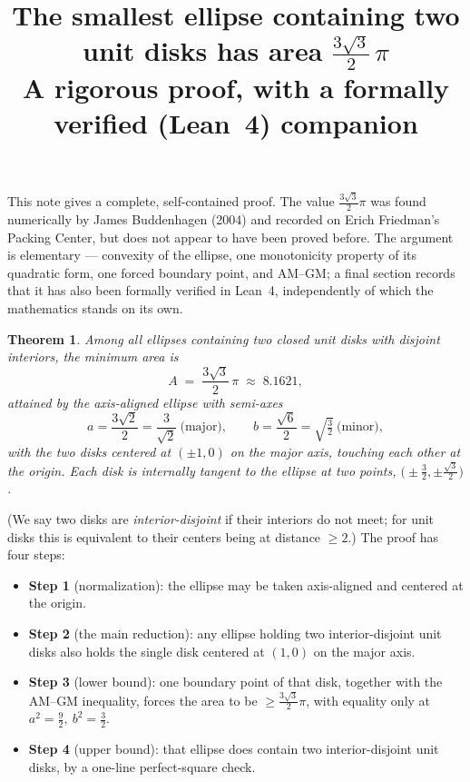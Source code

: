 \documentclass[11pt]{article}
\title{The smallest ellipse containing two unit disks has area $\tfrac{3\sqrt3}{2}\,\pi$\\[3pt]\large A rigorous proof, with a formally verified (Lean~4) companion}
\author{}
\date{}
\newtheorem{theorem}{Theorem}
\begin{document}
\maketitle

\noindent This note gives a complete, self-contained proof. The value $\tfrac{3\sqrt3}{2}\pi$ was found numerically by James Buddenhagen (2004) and recorded on Erich Friedman's Packing Center, but does not appear to have been proved before. The argument is elementary --- convexity of the ellipse, one monotonicity property of its quadratic form, one forced boundary point, and AM--GM; a final section records that it has also been formally verified in Lean~4, independently of which the mathematics stands on its own.

\begin{theorem}
Among all ellipses containing two closed unit disks with disjoint interiors, the minimum
area is
\[
A \;=\; \frac{3\sqrt3}{2}\,\pi \;\approx\; 8.1621,
\]
attained by the axis-aligned ellipse with semi-axes
\[
a=\frac{3\sqrt2}{2}=\frac{3}{\sqrt2}\ \text{(major)},\qquad
b=\frac{\sqrt6}{2}=\sqrt{\tfrac32}\ \text{(minor)},
\]
with the two disks centered at $(\pm1,0)$ on the major axis, touching each other at
the origin. Each disk is internally tangent to the ellipse at two points,
$\bigl(\pm\tfrac32,\pm\tfrac{\sqrt3}{2}\bigr)$.
\end{theorem}

\noindent (We say two disks are \emph{interior-disjoint} if their interiors do not meet; for unit
disks this is equivalent to their centers being at distance $\ge2$.) The proof has four steps:
\begin{itemize}[leftmargin=1.6em,itemsep=1pt]
  \item \textbf{Step 1} (normalization): the ellipse may be taken axis-aligned and centered at the
        origin.
  \item \textbf{Step 2} (the main reduction): any ellipse holding two interior-disjoint unit disks
        also holds the single disk centered at $(1,0)$ on the major axis.
  \item \textbf{Step 3} (lower bound): one boundary point of that disk, together with the AM--GM
        inequality, forces the area to be $\ge\tfrac{3\sqrt3}{2}\pi$, with equality only at
        $a^2=\tfrac92,\ b^2=\tfrac32$.
  \item \textbf{Step 4} (upper bound): that ellipse does contain two interior-disjoint unit disks,
        by a one-line perfect-square check.
\end{itemize}
\end{document}

